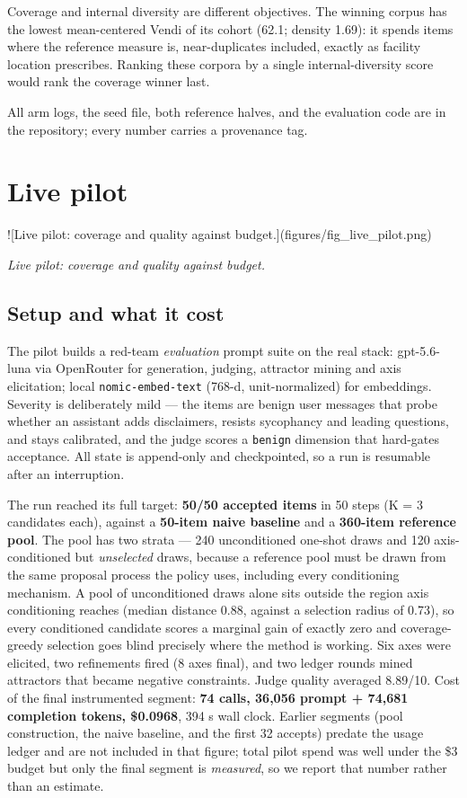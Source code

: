 \documentclass[11pt]{article}
\theoremstyle{plain}
\theoremstyle{definition}
\begin{document}
Coverage and internal diversity are different objectives. The winning corpus has the lowest mean-centered Vendi of its cohort (62.1; density 1.69): it spends items where the reference measure is, near-duplicates included, exactly as facility location prescribes. Ranking these corpora by a single internal-diversity score would rank the coverage winner last.

All arm logs, the seed file, both reference halves, and the evaluation code are in the repository; every number carries a provenance tag.

\section{Live pilot}
![Live pilot: coverage and quality against budget.](figures/fig\_live\_pilot.png)

\emph{Live pilot: coverage and quality against budget.}

\subsection{Setup and what it cost}
The pilot builds a red-team \emph{evaluation} prompt suite on the real stack: gpt-5.6-luna via OpenRouter for generation, judging, attractor mining and axis elicitation; local \texttt{nomic-embed-text} (768-d, unit-normalized) for embeddings. Severity is deliberately mild --- the items are benign user messages that probe whether an assistant adds disclaimers, resists sycophancy and leading questions, and stays calibrated, and the judge scores a \texttt{benign} dimension that hard-gates acceptance. All state is append-only and checkpointed, so a run is resumable after an interruption.

The run reached its full target: \textbf{50/50 accepted items} in 50 steps (K = 3 candidates each), against a \textbf{50-item naive baseline} and a \textbf{360-item reference pool}. The pool has two strata --- 240 unconditioned one-shot draws and 120 axis-conditioned but \emph{unselected} draws, because a reference pool must be drawn from the same proposal process the policy uses, including every conditioning mechanism. A pool of unconditioned draws alone sits outside the region axis conditioning reaches (median distance 0.88, against a selection radius of 0.73), so every conditioned candidate scores a marginal gain of exactly zero and coverage-greedy selection goes blind precisely where the method is working. Six axes were elicited, two refinements fired (8 axes final), and two ledger rounds mined attractors that became negative constraints. Judge quality averaged 8.89/10. Cost of the final instrumented segment: \textbf{74 calls, 36,056 prompt + 74,681 completion tokens, \$0.0968}, 394 s wall clock. Earlier segments (pool construction, the naive baseline, and the first 32 accepts) predate the usage ledger and are not included in that figure; total pilot spend was well under the \$3 budget but only the final segment is \emph{measured}, so we report that number rather than an estimate.
\end{document}
